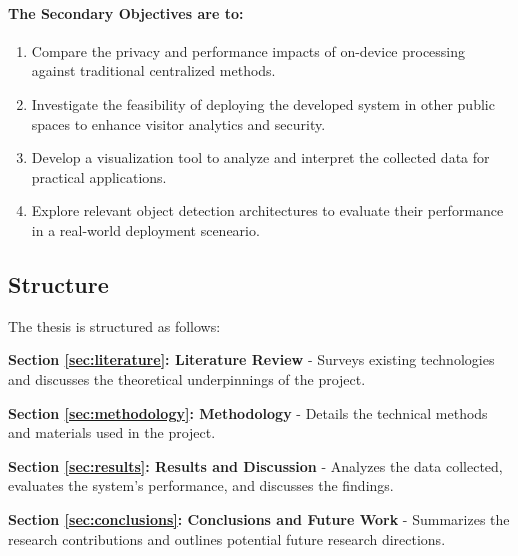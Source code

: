 \paragraph{The Secondary Objectives are to:}
\begin{enumerate}
	\item Compare the privacy and performance impacts of on-device processing against traditional centralized methods. 
	\item Investigate the feasibility of deploying the developed system in other public spaces to enhance visitor analytics and security.
	\item Develop a visualization tool to analyze and interpret the collected data for practical applications.
	\item Explore relevant object detection architectures to evaluate their performance in a real-world deployment sceneario. 
\end{enumerate}


\subsection{Structure}
\label{sec:structure}
The thesis is structured as follows:

\textbf{Section \ref{sec:literature}: Literature Review} - Surveys existing technologies and discusses the theoretical underpinnings of the project.

\textbf{Section \ref{sec:methodology}: Methodology} - Details the technical methods and materials used in the project.

\textbf{Section \ref{sec:results}: Results and Discussion} - Analyzes the data collected, evaluates the system's performance, and discusses the findings.

\textbf{Section \ref{sec:conclusions}: Conclusions and Future Work} - Summarizes the research contributions and outlines potential future research directions.
